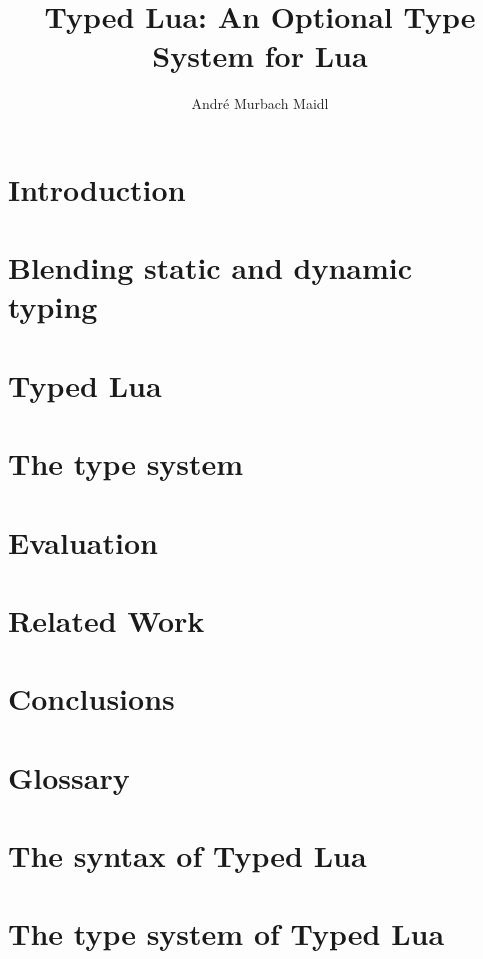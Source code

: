 \documentclass[phd,oneside,british]{ThesisPUC_uk}
\author{André Murbach Maidl}
\title{Typed Lua: An Optional Type System for Lua}
\begin{document}
\chapter{Introduction}
\label{chap:intro}


\chapter{Blending static and dynamic typing}
\label{chap:review}


\chapter{Typed Lua}
\label{chap:typedlua}


\chapter{The type system}
\label{chap:system}


\chapter{Evaluation}
\label{chap:evaluation}


\chapter{Related Work}
\label{chap:related}


\chapter{Conclusions}
\label{chap:conc}




\appendix

\chapter{Glossary}
\label{app:glossary}


\chapter{The syntax of Typed Lua}
\label{app:syntax}


\chapter{The type system of Typed Lua}
\label{app:rules}

\end{document}

